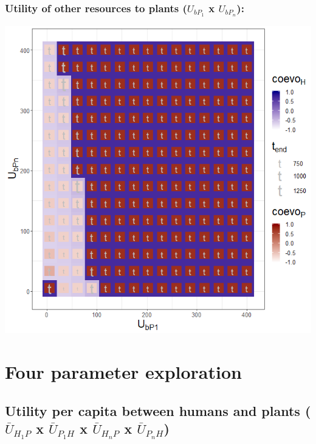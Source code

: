 \documentclass[]{book}
\begin{document}
\newpage

\hypertarget{utility-of-other-resources-to-plants-u_bp_1-x-u_bp_n}{%
\subsection{\texorpdfstring{Utility of other resources to plants (\(U_{bP_{1}}\) x \(U_{bP_{n}}\)):}{Utility of other resources to plants (U\_\{bP\_\{1\}\} x U\_\{bP\_\{n\}\}):}}\label{utility-of-other-resources-to-plants-u_bp_1-x-u_bp_n}}

\includegraphics[width=1\linewidth]{plots/3_twoPar-U.bP1-U.bPn_plot}

\hypertarget{four-parameter-exploration}{%
\chapter{Four parameter exploration}\label{four-parameter-exploration}}

\newpage

\hypertarget{utility-per-capita-between-humans-and-plants-baru_h_1p-x-baru_p_1h-x-baru_h_np-x-baru_p_nh}{%
\section{\texorpdfstring{Utility per capita between humans and plants (\(\bar{U}_{H_{1}P}\) x \(\bar{U}_{P_{1}H}\) x \(\bar{U}_{H_{n}P}\) x \(\bar{U}_{P_{n}H}\))}{Utility per capita between humans and plants (\textbackslash{}bar\{U\}\_\{H\_\{1\}P\} x \textbackslash{}bar\{U\}\_\{P\_\{1\}H\} x \textbackslash{}bar\{U\}\_\{H\_\{n\}P\} x \textbackslash{}bar\{U\}\_\{P\_\{n\}H\})}}\label{utility-per-capita-between-humans-and-plants-baru_h_1p-x-baru_p_1h-x-baru_h_np-x-baru_p_nh}}
\end{document}
